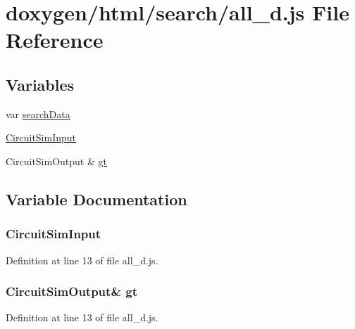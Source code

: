 \hypertarget{a00058}{}\section{doxygen/html/search/all\+\_\+d.js File Reference}
\label{a00058}
\subsection*{Variables}
\begin{DoxyCompactItemize}
\item 
var \hyperlink{a00058_ad01a7523f103d6242ef9b0451861231e}{search\+Data}
\item 
\hyperlink{a00058_a3b2037e87581e24a76ea975b24cd0def}{Circuit\+Sim\+Input}
\item 
Circuit\+Sim\+Output \& \hyperlink{a00058_ac7868f17f85d4d214dad20ef4d08e7de}{gt}
\end{DoxyCompactItemize}


\subsection{Variable Documentation}
\hypertarget{a00058_a3b2037e87581e24a76ea975b24cd0def}{}
\subsubsection[{Circuit\+Sim\+Input}]{\setlength{\rightskip}{0pt plus 5cm}Circuit\+Sim\+Input}\label{a00058_a3b2037e87581e24a76ea975b24cd0def}


Definition at line 13 of file all\+\_\+d.\+js.

\hypertarget{a00058_ac7868f17f85d4d214dad20ef4d08e7de}{}
\subsubsection[{gt}]{\setlength{\rightskip}{0pt plus 5cm}Circuit\+Sim\+Output\& gt}\label{a00058_ac7868f17f85d4d214dad20ef4d08e7de}


Definition at line 13 of file all\+\_\+d.\+js.

\hypertarget{a00058_ad01a7523f103d6242ef9b0451861231e}{}

